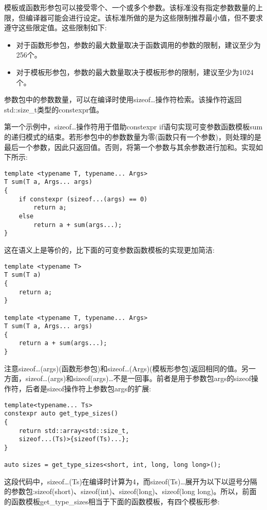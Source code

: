 
模板或函数形参包可以接受零个、一个或多个参数。该标准没有指定参数数量的上限，但编译器可能会进行设定。该标准所做的是为这些限制推荐最小值，但不要求遵守这些限定值。这些限制如下:

\begin{itemize}
\item
对于函数形参包，参数的最大数量取决于函数调用的参数的限制，建议至少为256个。

\item
对于模板形参包，参数的最大数量取决于模板形参的限制，建议至少为1024个。
\end{itemize}

参数包中的参数数量，可以在编译时使用sizeof…操作符检索。该操作符返回std::size\_t类型的constexpr值。

第一个示例中，sizeof…操作符用于借助constexpr if语句实现可变参数函数模板sum的递归模式的结束。若形参包中的参数数量为零(函数只有一个参数)，则处理的是最后一个参数，因此只返回值。否则，将第一个参数与其余参数进行加和。实现如下所示:

\begin{lstlisting}[style=styleCXX]
template <typename T, typename... Args>
T sum(T a, Args... args)
{
	if constexpr (sizeof...(args) == 0)
		return a;
	else
		return a + sum(args...);
}
\end{lstlisting}

这在语义上是等价的，比下面的可变参数函数模板的实现更加简洁:

\begin{lstlisting}[style=styleCXX]
template <typename T>
T sum(T a)
{
	return a;
}

template <typename T, typename... Args>
T sum(T a, Args... args)
{
	return a + sum(args...);
}
\end{lstlisting}

注意sizeof…(args)(函数形参包)和sizeof…(Args)(模板形参包)返回相同的值。另一方面，sizeof…(args)和sizeof(args)…不是一回事。前者是用于参数包args的sizeof操作符，后者是sizeof操作符上参数包args的扩展:

\begin{lstlisting}[style=styleCXX]
template<typename... Ts>
constexpr auto get_type_sizes()
{
	return std::array<std::size_t,
	sizeof...(Ts)>{sizeof(Ts)...};
}

auto sizes = get_type_sizes<short, int, long, long long>();
\end{lstlisting}

这段代码中，sizeof…(Ts)在编译时计算为4，而sizeof(Ts)…展开为以下以逗号分隔的参数包:sizeof(short)、sizeof(int)、sizeof(long)、sizeof(long long)。所以，前面的函数模板get\_type\_sizes相当于下面的函数模板，有四个模板形参:


